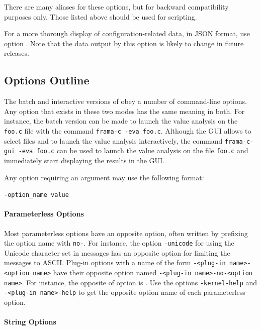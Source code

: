 There are many aliases for these options, but for backward compatibility purposes only.
Those listed above should be used for scripting.

For a more thorough display of configuration-related data, in JSON format,
use option . Note that the data output by this
option is likely to change in future releases.

\subsection{Options Outline}

The batch and interactive versions of \FramaC obey a number of
command-line options. Any option that exists in these two modes
has the same meaning in both.
For instance, the batch version can be made to launch the value analysis
on the \verb|foo.c| file with the command \verb|frama-c -eva foo.c|.
Although the GUI allows to select files and to
launch the value analysis interactively, the
command \verb|frama-c-gui -eva foo.c| can be used to launch the value
analysis on the file \verb|foo.c| and immediately start displaying the results
in the GUI.

Any option requiring an argument may use the following
format:
\begin{commands}
\texttt{-option\_name value}
\end{commands}

\paragraph{Parameterless Options}

Most parameterless options have an opposite option, often written by prefixing
the option name with \texttt{no-}.  For instance, the option \verb|-unicode|
for using the Unicode character set in messages has an opposite option
 for limiting the messages to ASCII.  Plug-in options
with
a name of the form \texttt{-<plug-in name>-<option name>} have their opposite
option named \texttt{-<plug-in name>-no-<option name>}. For instance, the
opposite of option  is .
Use the options \texttt{-kernel-help} and
\texttt{-<plug-in name>-help} to get the opposite option name of each
parameterless option.

\paragraph{String Options}

